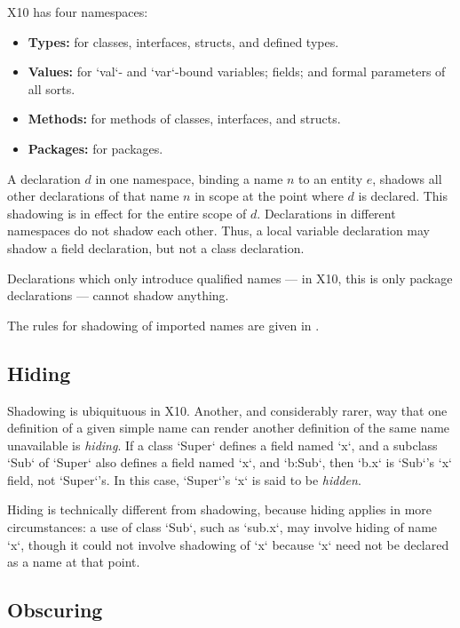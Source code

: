 X10 has four namespaces:
\begin{itemize}
\item {\bf Types:} for classes, interfaces, structs, and defined types.
\item {\bf Values:} for \xcd`val`- and \xcd`var`-bound variables; fields;
      and formal parameters of all sorts.
\item {\bf Methods:} for methods of classes, interfaces, and structs.
\item {\bf Packages:} for packages.
\end{itemize}

A declaration $d$ in one namespace, binding a name $n$ to an entity $e$,
shadows all other declarations of that name $n$ in scope at the point where
$d$ is declared. This shadowing is in effect for the entire scope of $d$.  
Declarations in different namespaces do not shadow each other.
Thus, a local variable declaration may shadow a field declaration, but not a
class declaration.

Declarations which only introduce qualified names --- in X10, this is only
package declarations --- cannot shadow anything.

The rules for shadowing of imported names are given in .

\subsection{Hiding}
\label{sect:Hiding}

Shadowing is ubiquituous in X10. Another, and considerably rarer, way that one
definition of a given simple name can render another definition of the same
name unavailable is {\em hiding}. If a class \xcd`Super` defines a field named
\xcd`x`, and a subclass \xcd`Sub` of \xcd`Super` also defines a field named
\xcd`x`, and \xcd`b:Sub`, then \xcd`b.x` is \xcd`Sub`'s \xcd`x` field, not
\xcd`Super`'s.  
In this case, \xcd`Super`'s \xcd`x` is said
to be {\em hidden}.

Hiding is technically different from shadowing, because hiding applies in more
circumstances: a use of class \xcd`Sub`, such as \xcd`sub.x`, may involve
hiding of name \xcd`x`, though it could not involve shadowing of \xcd`x`
because \xcd`x` need not be declared as a name at that point.

\subsection{Obscuring}
\label{sect:Obscuring}

